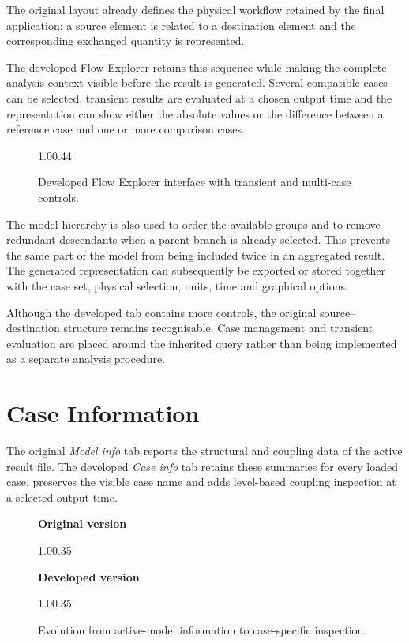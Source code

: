 The original layout already defines the physical workflow retained by the final
application: a source element is related to a destination element and the
corresponding exchanged quantity is represented.

The developed Flow Explorer retains this sequence while making the complete
analysis context visible before the result is generated. Several compatible cases can be selected, transient
results are evaluated at a chosen output time and the representation can show
either the absolute values or the difference between a reference case and one
or more comparison cases.

\begin{figure}[H]
    \centering
        {1.0\textwidth}{0.44\textheight}
    \caption{Developed Flow Explorer interface with transient and multi-case
    controls.}
    \label{fig:appendix_final_flow_explorer}
\end{figure}

The model hierarchy is also used to order the available groups and to remove
redundant descendants when a parent branch is already selected. This prevents
the same part of the model from being included twice in an aggregated result.
The generated representation can subsequently be exported or stored together
with the case set, physical selection, units, time and graphical options.

Although the developed tab contains more controls, the original
source--destination structure remains recognisable. Case management and
transient evaluation are placed around the inherited query rather than being
implemented as a separate analysis procedure.

\section{Case Information}
\label{appsec:case_information_evolution}

The original \textit{Model info} tab reports the structural and coupling data
of the active result file. The developed \textit{Case info} tab retains these
summaries for every loaded case, preserves the visible case name and adds
level-based coupling inspection at a selected output time.

\begin{figure}[H]
    \centering
    \textbf{Original version}\par\vspace{0.5em}
        {1.0\textwidth}{0.35\textheight}

    \vspace{1em}
    \textbf{Developed version}\par\vspace{0.5em}
        {1.0\textwidth}{0.35\textheight}

    \caption{Evolution from active-model information to case-specific
    inspection.}
    \label{fig:appendix_case_information_evolution}
\end{figure}

